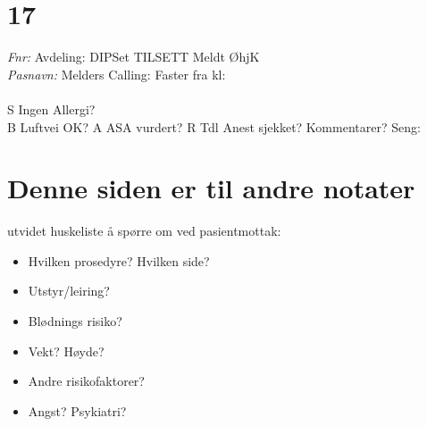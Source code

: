 \documentclass[article]{res}
\begin{document}
\begin{resume}
\section{17 \hspace{2em} }\vspace{.6em}
  {\sl Fnr:}  \hspace{15em}Avdeling: \hfill DIPSet \makebox[0pt][l]{$\square$}\raisebox{.15ex}{\hspace{1em}}
   TILSETT \makebox[0pt][l]{$\square$}\raisebox{.15ex}{\hspace{0.7em}} Meldt ØhjK \makebox[0pt][l]{$\square$}\raisebox{.15ex}{\hspace{0.1em}}
   \\ \newline
  {\sl Pasnavn:}   \hfill Melders Calling: \hspace{2em} Faster fra kl:\hspace{2em} \\
  \\
  S \hfill Ingen Allergi? \makebox[0pt][l]{$\square$}\raisebox{.15ex}{\hspace{0.8em}} \\ \newline 
  B \hfill Luftvei OK? \makebox[0pt][l]{$\square$}\raisebox{.15ex}{\hspace{0.8em}} \newline \newline
  A \hfill ASA vurdert?\makebox[0pt][l]{$\square$}\raisebox{.15ex}{\hspace{0.8em}} \newline \newline
  R \hfill Tdl Anest sjekket? \makebox[0pt][l]{$\square$}\raisebox{.15ex}{\hspace{0.8em}} \newline \newline
  Kommentarer? \hfill Seng: \hspace{.8em}
  
  \newpage
  \section{Denne siden er til andre notater}
  utvidet huskeliste å spørre om ved pasientmottak:
  \begin{itemize}
	\item Hvilken prosedyre? Hvilken side? 
    \item Utstyr/leiring?
    \item Blødnings risiko?
    \item Vekt? Høyde?
    \item Andre risikofaktorer?
    \item Angst? Psykiatri?
\end{itemize}
 

\end{resume}
\end{document}

